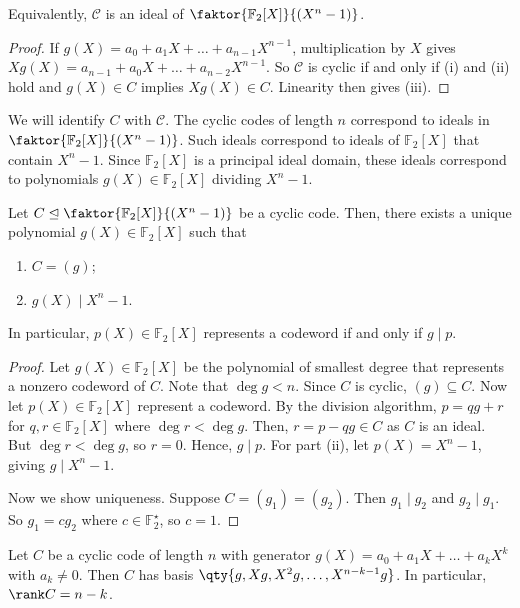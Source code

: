 Equivalently, $\mathcal C$ is an ideal of $\faktor{\mathbb F_2[X]}{(X^n - 1)}$.
\begin{proof}
    If $g(X) = a_0 + a_1X + \dots + a_{n-1}X^{n-1}$, multiplication by $X$ gives $Xg(X) = a_{n-1} + a_0X + \dots + a_{n-2}X^{n-1}$.
    So $\mathcal C$ is cyclic if and only if (i) and (ii) hold and $g(X) \in C$ implies $Xg(X) \in C$.
    Linearity then gives (iii).
\end{proof}
We will identify $C$ with $\mathcal C$.
The cyclic codes of length $n$ correspond to ideals in $\faktor{\mathbb F_2[X]}{(X^n - 1)}$.
Such ideals correspond to ideals of $\mathbb F_2[X]$ that contain $X^n - 1$.
Since $\mathbb F_2[X]$ is a principal ideal domain, these ideals correspond to polynomials $g(X) \in \mathbb F_2[X]$ dividing $X^n - 1$.
\begin{theorem}
    Let $C \trianglelefteq \faktor{\mathbb F_2[X]}{(X^n - 1)}$ be a cyclic code.
    Then, there exists a unique  polynomial $g(X) \in \mathbb F_2[X]$ such that
    \begin{enumerate}
        \item $C = (g)$;
        \item $g(X) \mid X^n - 1$.
    \end{enumerate}
    In particular, $p(X) \in \mathbb F_2[X]$ represents a codeword if and only if $g \mid p$.
\end{theorem}
\begin{proof}
    Let $g(X) \in \mathbb F_2[X]$ be the polynomial of smallest degree that represents a nonzero codeword of $C$.
    Note that $\deg g < n$.
    Since $C$ is cyclic, $(g) \subseteq C$.
    Now let $p(X) \in \mathbb F_2[X]$ represent a codeword.
    By the division algorithm, $p = qg + r$ for $q, r \in \mathbb F_2[X]$ where $\deg r < \deg g$.
    Then, $r = p - qg \in C$ as $C$ is an ideal.
    But $\deg r < \deg g$, so $r = 0$.
    Hence, $g \mid p$.
    For part (ii), let $p(X) = X^n - 1$, giving $g \mid X^n - 1$.

    Now we show uniqueness.
    Suppose $C = (g_1) = (g_2)$.
    Then $g_1 \mid g_2$ and $g_2 \mid g_1$.
    So $g_1 = cg_2$ where $c \in \mathbb F_2^\star$, so $c = 1$.
\end{proof}
\begin{lemma}
    Let $C$ be a cyclic code of length $n$ with generator $g(X) = a_0 + a_1 X + \dots + a_k X^k$ with $a_k \neq 0$.
    Then $C$ has basis $\qty{g, Xg, X^2g, \dots, X^{n-k-1}g}$.
    In particular, $\rank C = n - k$.
\end{lemma}

